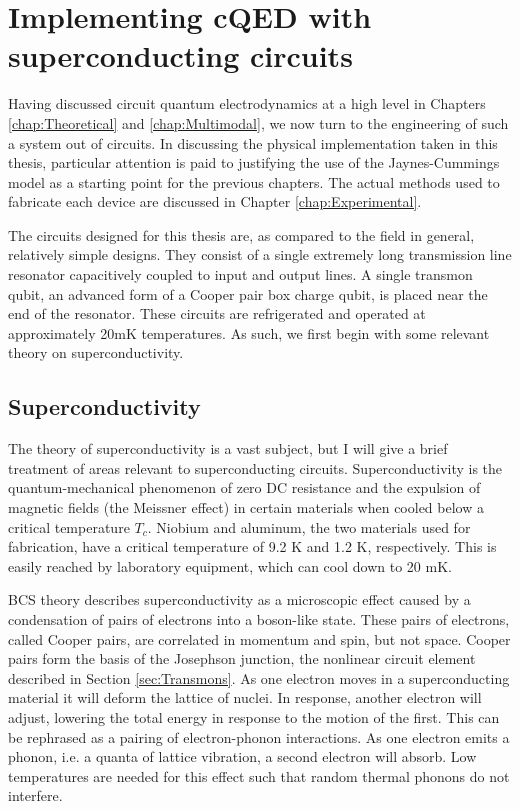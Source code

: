 \documentclass[11 pt, oneside]{book} %
\begin{document}
\chapter{Implementing cQED with superconducting circuits}\label{chap:Implementing}
Having discussed circuit quantum electrodynamics at a high level in Chapters \ref{chap:Theoretical} and \ref{chap:Multimodal}, we now turn to the engineering of such a system out of circuits. In discussing the physical implementation taken in this thesis, particular attention is paid to justifying the use of the Jaynes-Cummings model as a starting point for the previous chapters. The actual methods used to fabricate each device are discussed in Chapter \ref{chap:Experimental}.

The circuits designed for this thesis are, as compared to the field in general, relatively simple designs. They consist of a single extremely long transmission line resonator capacitively coupled to input and output lines. A single transmon qubit, an advanced form of a Cooper pair box charge qubit, is placed near the end of the resonator. These circuits are refrigerated and operated at approximately 20mK temperatures. As such, we first begin with some relevant theory on superconductivity. 

\section{Superconductivity}
The theory of superconductivity is a vast subject, but I will give a brief treatment of areas relevant to superconducting circuits. Superconductivity is the quantum-mechanical phenomenon of zero DC resistance and the expulsion of magnetic fields (the Meissner effect) in certain materials when cooled below a critical temperature $T_c$. Niobium and aluminum, the two materials used for fabrication, have a critical temperature of 9.2 K and 1.2 K, respectively. This is easily reached by laboratory equipment, which can cool down to 20 mK.

BCS theory describes superconductivity as a microscopic effect caused by a condensation of pairs of electrons into a boson-like state. These pairs of electrons, called Cooper pairs, are correlated in momentum and spin, but not space. Cooper pairs form the basis of the Josephson junction, the nonlinear circuit element described in Section \ref{sec:Transmons}. As one electron moves in a superconducting material it will deform the lattice of nuclei. In response, another electron will adjust, lowering the total energy in response to the motion of the first. This can be rephrased as a pairing of electron-phonon interactions. As one electron emits a phonon, i.e. a quanta of lattice vibration, a second electron will absorb. Low temperatures are needed for this effect such that random thermal phonons do not interfere. 
\end{document}
